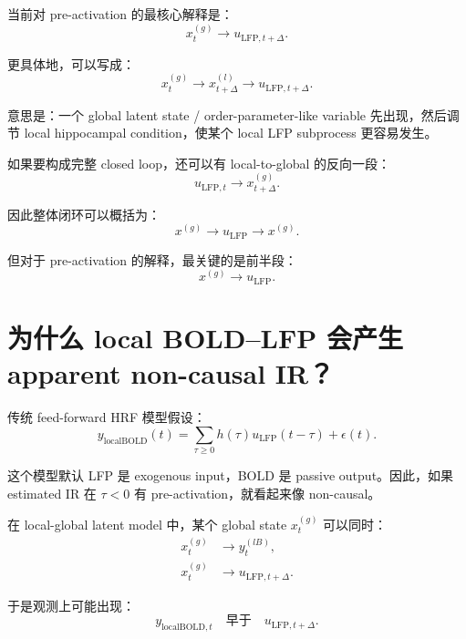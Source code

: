 \documentclass[11pt,a4paper]{ctexart}
\begin{document}
当前对 pre-activation 的最核心解释是：
\begin{equation}
    x_t^{(g)} \rightarrow u_{\mathrm{LFP},t+\Delta}.
\end{equation}

更具体地，可以写成：
\begin{equation}
    x_t^{(g)} \rightarrow x_{t+\Delta}^{(l)} \rightarrow u_{\mathrm{LFP},t+\Delta}.
\end{equation}

意思是：一个 global latent state / order-parameter-like variable 先出现，然后调节 local hippocampal condition，使某个 local LFP subprocess 更容易发生。

如果要构成完整 closed loop，还可以有 local-to-global 的反向一段：
\begin{equation}
    u_{\mathrm{LFP},t} \rightarrow x_{t+\Delta}^{(g)}.
\end{equation}

因此整体闭环可以概括为：
\begin{equation}
    x^{(g)} \rightarrow u_{\mathrm{LFP}} \rightarrow x^{(g)}.
\end{equation}

但对于 pre-activation 的解释，最关键的是前半段：
\begin{equation}
    x^{(g)} \rightarrow u_{\mathrm{LFP}}.
\end{equation}

\section{为什么 local BOLD--LFP 会产生 apparent non-causal IR？}

传统 feed-forward HRF 模型假设：
\begin{equation}
    y_{\mathrm{localBOLD}}(t)
    =
    \sum_{\tau\ge 0} h(\tau)u_{\mathrm{LFP}}(t-\tau)+\epsilon(t).
\end{equation}

这个模型默认 LFP 是 exogenous input，BOLD 是 passive output。因此，如果 estimated IR 在 $\tau<0$ 有 pre-activation，就看起来像 non-causal。

在 local-global latent model 中，某个 global state $x_t^{(g)}$ 可以同时：
\begin{align}
    x_t^{(g)} &\rightarrow y_t^{(lB)}, \\
    x_t^{(g)} &\rightarrow u_{\mathrm{LFP},t+\Delta}.
\end{align}

于是观测上可能出现：
\begin{equation}
    y_{\mathrm{localBOLD},t}
    \quad \text{早于} \quad
    u_{\mathrm{LFP},t+\Delta}.
\end{equation}
\end{document}
